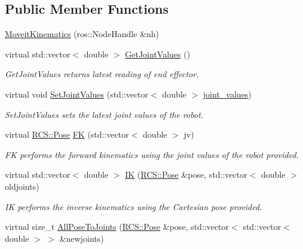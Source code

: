 \subsection*{Public Member Functions}
\begin{DoxyCompactItemize}
\item 
\hyperlink{classMoveitKinematics_aff96ca668755f869ba25a4a775e15eac}{Moveit\-Kinematics} (ros\-::\-Node\-Handle \&nh)
\item 
virtual std\-::vector$<$ double $>$ \hyperlink{classMoveitKinematics_a8f186684d000616a6ff805fa0f41151e}{Get\-Joint\-Values} ()
\begin{DoxyCompactList}\small\item\em Get\-Joint\-Values returns latest reading of end effector. \end{DoxyCompactList}\item 
virtual void \hyperlink{classMoveitKinematics_aee274ed4deddecb36191f8711c4b7c2e}{Set\-Joint\-Values} (std\-::vector$<$ double $>$ \hyperlink{classMoveitKinematics_a0ae2d3b65c1855ec6d6f094d1cd267f7}{joint\-\_\-values})
\begin{DoxyCompactList}\small\item\em Set\-Joint\-Values sets the latest joint values of the robot. \end{DoxyCompactList}\item 
virtual \hyperlink{namespaceRCS_aa07e45d8a50e30064283d2b38087f999}{R\-C\-S\-::\-Pose} \hyperlink{classMoveitKinematics_aef65c355097c1b8373f5bd60ef1b92f8}{F\-K} (std\-::vector$<$ double $>$ jv)
\begin{DoxyCompactList}\small\item\em F\-K performs the forward kinematics using the joint values of the robot provided. \end{DoxyCompactList}\item 
virtual std\-::vector$<$ double $>$ \hyperlink{classMoveitKinematics_a70fa6e222157b71b6bf8fa7ed33075cc}{I\-K} (\hyperlink{namespaceRCS_aa07e45d8a50e30064283d2b38087f999}{R\-C\-S\-::\-Pose} \&pose, std\-::vector$<$ double $>$ oldjoints)
\begin{DoxyCompactList}\small\item\em I\-K performs the inverse kinematics using the Cartesian pose provided. \end{DoxyCompactList}\item 
virtual size\-\_\-t \hyperlink{classMoveitKinematics_a256bfc139809c215c34112a38938a372}{All\-Pose\-To\-Joints} (\hyperlink{namespaceRCS_aa07e45d8a50e30064283d2b38087f999}{R\-C\-S\-::\-Pose} \&pose, std\-::vector$<$ std\-::vector$<$ double $>$ $>$ \&newjoints)

\end{DoxyCompactItemize}
